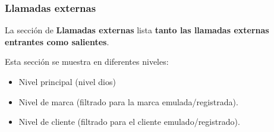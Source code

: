 \documentclass[letterpaper,10pt,spanish]{sphinxmanual}
\begin{document}
\subsubsection{Llamadas externas}
\label{administration_portal/client/residential/calls/external_calls::doc}\label{administration_portal/client/residential/calls/external_calls:external-calls}
La sección de \textbf{Llamadas externas} lista \textbf{tanto las llamadas externas entrantes como salientes}.

Esta sección se muestra en diferentes niveles:
\begin{itemize}
\item {} 
Nivel principal (nivel dios)

\item {} 
Nivel de marca (filtrado para la marca emulada/registrada).

\item {} 
Nivel de cliente (filtrado para el cliente emulado/registrado).

\end{itemize}
\end{document}
